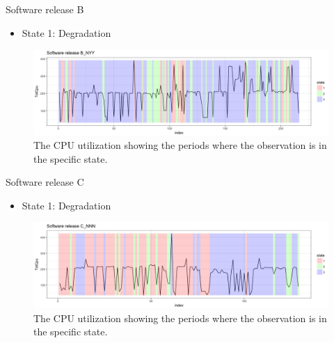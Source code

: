 \documentclass{beamer}
\begin{document}
\begin{frame}
Software release B

\begin{itemize}
\item State 1: Degradation
\end{itemize}

\begin{figure}
\includegraphics[width=1\linewidth]{L16B_NYY1}
\caption{The CPU utilization showing the periods where the observation is in the specific state.}
\end{figure}

\end{frame}

\begin{frame}
Software release C

\begin{itemize}
\item State 1: Degradation
\end{itemize}

\begin{figure}
\includegraphics[width=1\linewidth]{L17A_NNN1}
\caption{The CPU utilization showing the periods where the observation is in the specific state.}
\end{figure}

\end{frame}
\end{document}
